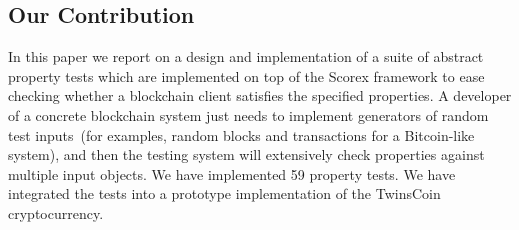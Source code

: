 
\subsection{Our Contribution}

In this paper we report on a design and implementation of a suite of abstract property tests which are implemented on top of the Scorex framework to ease checking whether a blockchain client satisfies the specified properties. A developer of a concrete blockchain system just needs to implement generators of random test inputs~(for examples, random blocks and transactions for a Bitcoin-like system), and then the testing system will extensively check properties against multiple input objects. We have implemented 59 property tests. We have integrated the tests into a prototype implementation of the TwinsCoin~\cite{cryptoeprint:2017:232} cryptocurrency.  
